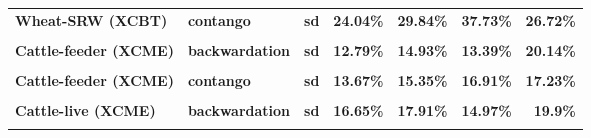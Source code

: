 \documentclass[
  authoryear,
  preprint,
  3p]{elsarticle}
\begin{document}
\begin{longtable}[t]{>{}l>{}l>{}l>{}r>{}r>{}r>{}r}
\textbf{Wheat-SRW (XCBT)} & \textbf{contango} & \textbf{sd} & \textcolor[HTML]{4285f4}{\textbf{24.04\%}} & \textcolor[HTML]{4285f4}{\textbf{29.84\%}} & \textcolor[HTML]{4285f4}{\textbf{37.73\%}} & \textcolor[HTML]{4285f4}{\textbf{26.72\%}}\\
\textbf{\cellcolor{gray!10}{Cattle-feeder (XCME)}} & \textbf{\cellcolor{gray!10}{backwardation}} & \textbf{\cellcolor{gray!10}{mean}} & \textcolor[HTML]{4285f4}{\textbf{\cellcolor{gray!10}{2.31\%}}} & \textcolor[HTML]{4285f4}{\textbf{\cellcolor{gray!10}{**20.52\%}}} & \textcolor[HTML]{4285f4}{\textbf{\cellcolor{gray!10}{7.51\%}}} & \textcolor[HTML]{4285f4}{\textbf{\cellcolor{gray!10}{6.58\%}}}\\
\addlinespace
\textbf{Cattle-feeder (XCME)} & \textbf{backwardation} & \textbf{sd} & \textcolor[HTML]{4285f4}{\textbf{12.79\%}} & \textcolor[HTML]{4285f4}{\textbf{14.93\%}} & \textcolor[HTML]{4285f4}{\textbf{13.39\%}} & \textcolor[HTML]{4285f4}{\textbf{20.14\%}}\\
\textbf{\cellcolor{gray!10}{Cattle-feeder (XCME)}} & \textbf{\cellcolor{gray!10}{contango}} & \textbf{\cellcolor{gray!10}{mean}} & \textcolor[HTML]{4285f4}{\textbf{\cellcolor{gray!10}{-0.81\%}}} & \textcolor[HTML]{4285f4}{\textbf{\cellcolor{gray!10}{-5.49\%}}} & \textcolor[HTML]{4285f4}{\textbf{\cellcolor{gray!10}{7.28\%}}} & \textcolor[HTML]{4285f4}{\textbf{\cellcolor{gray!10}{-3.12\%}}}\\
\textbf{Cattle-feeder (XCME)} & \textbf{contango} & \textbf{sd} & \textcolor[HTML]{4285f4}{\textbf{13.67\%}} & \textcolor[HTML]{4285f4}{\textbf{15.35\%}} & \textcolor[HTML]{4285f4}{\textbf{16.91\%}} & \textcolor[HTML]{4285f4}{\textbf{17.23\%}}\\
\textbf{\cellcolor{gray!10}{Cattle-live (XCME)}} & \textbf{\cellcolor{gray!10}{backwardation}} & \textbf{\cellcolor{gray!10}{mean}} & \textcolor[HTML]{4285f4}{\textbf{\cellcolor{gray!10}{8.39\%}}} & \textcolor[HTML]{4285f4}{\textbf{\cellcolor{gray!10}{14.2\%}}} & \textcolor[HTML]{4285f4}{\textbf{\cellcolor{gray!10}{5.87\%}}} & \textcolor[HTML]{4285f4}{\textbf{\cellcolor{gray!10}{-2.07\%}}}\\
\textbf{Cattle-live (XCME)} & \textbf{backwardation} & \textbf{sd} & \textcolor[HTML]{4285f4}{\textbf{16.65\%}} & \textcolor[HTML]{4285f4}{\textbf{17.91\%}} & \textcolor[HTML]{4285f4}{\textbf{14.97\%}} & \textcolor[HTML]{4285f4}{\textbf{19.9\%}}\\
\addlinespace
\textbf{\cellcolor{gray!10}{Cattle-live (XCME)}} & \textbf{\cellcolor{gray!10}{contango}} & \textbf{\cellcolor{gray!10}{mean}} & \textcolor[HTML]{4285f4}{\textbf{\cellcolor{gray!10}{-0.34\%}}} & \textcolor[HTML]{4285f4}{\textbf{\cellcolor{gray!10}{3.43\%}}} & \textcolor[HTML]{4285f4}{\textbf{\cellcolor{gray!10}{2.7\%}}} & \textcolor[HTML]{4285f4}{\textbf{\cellcolor{gray!10}{5.82\%}}}\\

\end{longtable}
\end{document}
